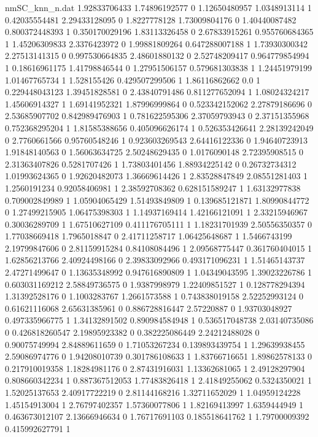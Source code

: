 \begin{filecontents}{nmSC_knn_n.dat}
1.92833706433 1.74896192577 0
1.12650480957 1.0348913114 1
0.42035554481 2.29433128095 0
1.8227778128 1.73009804176 0
1.40440087482 0.800372448393 1
0.350170029196 1.83113326458 0
2.67833915261 0.955760684365 1
1.45206309833 2.3376423972 0
1.99881809264 0.647288007188 1
1.73930300342 2.27513141315 0
0.997530664835 2.48601880132 0
2.52748209417 0.964779854994 1
0.18616961175 1.41798846544 0
1.27951506157 0.579681303838 1
1.24451979199 1.01467765734 1
1.528155426 0.429507299506 1
1.86116862662 0.0 1
0.229448043123 1.39451828581 0
2.43840791486 0.811277652094 1
1.08024324217 1.45606914327 1
1.69141952321 1.87996999864 0
0.523342152062 2.27879186696 0
2.53685907702 0.842989476903 1
0.781622595306 2.37059793943 0
2.37151355968 0.752368295204 1
1.81585388656 0.405096626174 1
0.526353426641 2.28139242049 0
2.7760661566 0.95760548246 1
0.923603269543 2.64416122336 0
1.94640723913 1.91848140563 0
1.56063634725 2.50248629435 0
1.0176090148 2.72395908515 0
2.31363407826 0.5281707426 1
1.73803401456 1.88934225142 0
0.26732734312 1.01993624365 0
1.92620482073 1.36669614426 1
2.83528847849 2.08551281403 1
1.2560191234 0.92058406981 1
2.38592708362 0.628151589247 1
1.63132977838 0.709002849989 1
1.05904065429 1.51493849809 1
0.139685121871 1.80990844772 0
1.27499215905 1.06475398303 1
1.14937169414 1.42166121091 1
2.33215946967 0.30036289709 1
1.67510627109 0.411176705111 1
1.18231701939 2.50556350357 0
1.77038669418 1.7965018847 0
2.41711258717 1.06425648687 1
1.5466743199 2.19799847606 0
2.81159915284 0.84108084496 1
2.09568775447 0.361760404015 1
1.62856213766 2.40924498166 0
2.39833092966 0.493171096231 1
1.51465143737 2.47271499647 0
1.13635348992 0.947616890809 1
1.04349043595 1.39023226786 1
0.603031169212 2.58849736575 0
1.9387998979 1.22409851527 1
0.128778294394 1.31392528176 0
1.1003283767 1.2661573588 1
0.743838019158 2.52252993124 0
0.61621116068 2.65631385961 0
0.886728816447 2.57220887 0
1.93703048927 0.497335966775 1
1.34132891502 0.890984584948 1
0.536517048738 2.03140735086 0
0.426818260547 2.19895923382 0
0.382225086449 2.24212488028 0
0.90075749994 2.84889611659 0
1.71053267234 0.139893439754 1
1.29639938455 2.59086974776 0
1.94208010739 0.301786108633 1
1.83766716651 1.89862578133 0
0.217910019358 1.18284981176 0
2.87431916031 1.13362681065 1
2.49128297904 0.808660342234 1
0.887367512053 1.77483826418 1
2.41849255062 0.5324350021 1
1.52025137653 2.40917722219 0
2.81144168216 1.32711652029 1
1.04959124228 1.45154913004 1
2.76797402357 1.57360077806 1
1.82169413997 1.6359444949 1
0.463673012107 2.13666946634 0
1.76717691103 0.185518641762 1
1.79700009392 0.415992627791 1

\end{filecontents}
